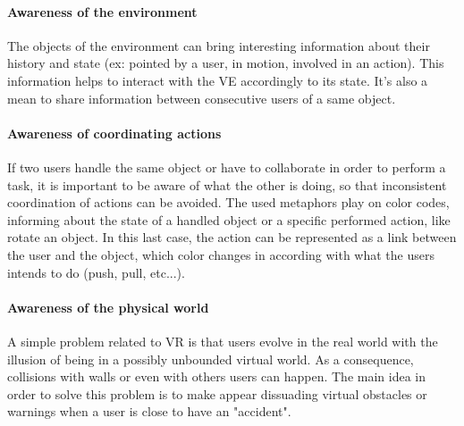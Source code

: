 \documentclass[a4paper]{article}
\begin{document}
\paragraph{Awareness of the environment}
The objects of the environment can bring interesting information about their history and state (ex: pointed by a user, in motion, involved in an action). This information helps to interact with the VE accordingly to its state. It's also a mean to share information between consecutive users of a same object.

\paragraph{Awareness of coordinating actions}
If two users handle the same object or have to collaborate in order to perform a task, it is important to be aware of what the other is doing, so that inconsistent coordination of actions can be avoided. The used metaphors play on color codes, informing about the state of a handled object or a specific performed action, like rotate an object. In this last case, the action can be represented as a link between the user and the object, which color changes in according with what the users intends to do (push, pull, etc...).

\paragraph{Awareness of the physical world}
A simple problem related to VR is that users evolve in the real world with the illusion of being in a possibly unbounded virtual world. As a consequence, collisions with walls or even with others users can happen. The main idea in order to solve this problem is to make appear dissuading virtual obstacles or warnings when a user is close to have an "accident". 
\end{document}
